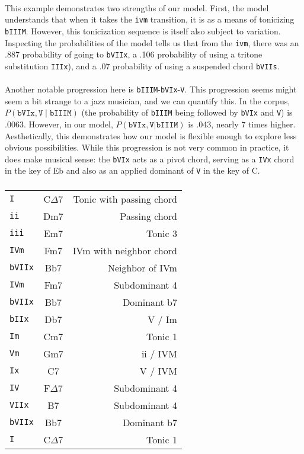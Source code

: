 \documentclass[]{article}
\begin{document}
\paragraph{} This example demonstrates two strengths of our model.  First, the model understands that when it takes the \texttt{ivm} transition, it is as a means of tonicizing \texttt{bIIIM}.  However, this tonicization sequence is itself also subject to variation.  Inspecting the probabilities of the model tells us that from the \texttt{ivm}, there was an .887 probability of going to \texttt{bVIIx}, a .106 probability of using a tritone substitution \texttt{IIIx}), and a .07 probability of using a suspended chord \texttt{bVIIs}.

\paragraph{} Another notable progression here is \texttt{bIIIM}-\texttt{bVIx}-\texttt{V}.  This progression seems might seem a bit strange to a jazz musician, and we can quantify this.  In the corpus, $P(\texttt{bVIx},\texttt{V} \mid \texttt{bIIIM})$ (the probability of \texttt{bIIIM} being followed by \texttt{bVIx} and \texttt{V}) is .0063.  However, in our model, $P(\texttt{bVIx},\texttt{V} | \texttt{bIIIM})$ is .043, nearly 7 times higher.  Aesthetically, this demonstrates how our model is flexible enough to explore less obvious possibilities.  While this progression is not very common in practice, it does make musical sense: the \texttt{bVIx} acts as a pivot chord, serving as a \texttt{IVx} chord in the key of Eb and also as an applied dominant of \texttt{V} in the key of C.

\subsubsection{}
\begin{tabular}{l|c|r}
	\texttt{I} & C$\Delta$7 & Tonic with passing chord \\
	\texttt{ii} & Dm7 & Passing chord \\
	\texttt{iii} & Em7 & Tonic 3 \\
	\texttt{IVm} & Fm7 & IVm with neighbor chord \\
	\texttt{bVIIx} & Bb7 & Neighbor of IVm \\
	\texttt{IVm} & Fm7 & Subdominant 4 \\
	\texttt{bVIIx} & Bb7 & Dominant b7 \\
	\texttt{bIIx} & Db7 & V / Im \\
	\texttt{Im} & Cm7 & Tonic 1 \\
	\texttt{Vm} & Gm7 & ii / IVM \\
	\texttt{Ix} & C7 & V / IVM \\
	\texttt{IV} & F$\Delta$7 & Subdominant 4 \\
	\texttt{VIIx} & B7 & Subdominant 4 \\
	\texttt{bVIIx} & Bb7 & Dominant b7 \\
	\texttt{I} & C$\Delta$7 & Tonic 1 \\
\end{tabular}
\end{document}
